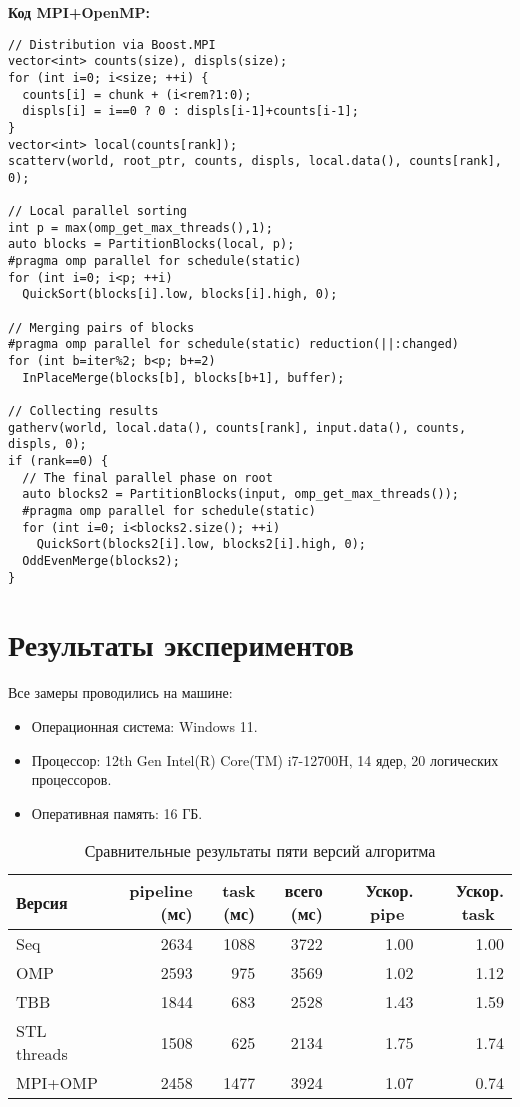 \documentclass[12pt]{article}
\begin{document}
\noindent\textbf{Код MPI+OpenMP:}
\lstset{language=C++}
\begin{lstlisting}
// Distribution via Boost.MPI
vector<int> counts(size), displs(size);
for (int i=0; i<size; ++i) {
  counts[i] = chunk + (i<rem?1:0);
  displs[i] = i==0 ? 0 : displs[i-1]+counts[i-1];
}
vector<int> local(counts[rank]);
scatterv(world, root_ptr, counts, displs, local.data(), counts[rank], 0);

// Local parallel sorting
int p = max(omp_get_max_threads(),1);
auto blocks = PartitionBlocks(local, p);
#pragma omp parallel for schedule(static)
for (int i=0; i<p; ++i)
  QuickSort(blocks[i].low, blocks[i].high, 0);

// Merging pairs of blocks
#pragma omp parallel for schedule(static) reduction(||:changed)
for (int b=iter%2; b<p; b+=2)
  InPlaceMerge(blocks[b], blocks[b+1], buffer);

// Collecting results
gatherv(world, local.data(), counts[rank], input.data(), counts, displs, 0);
if (rank==0) {
  // The final parallel phase on root
  auto blocks2 = PartitionBlocks(input, omp_get_max_threads());
  #pragma omp parallel for schedule(static)
  for (int i=0; i<blocks2.size(); ++i)
    QuickSort(blocks2[i].low, blocks2[i].high, 0);
  OddEvenMerge(blocks2);
}
\end{lstlisting}

\clearpage
\section{Результаты экспериментов}
\hspace*{1.25em}Все замеры проводились на машине:
\begin{itemize}
  \item Операционная система: Windows 11.
  \item Процессор: 12th Gen Intel(R) Core(TM) i7-12700H, 14 ядер, 20 логических процессоров.
  \item Оперативная память: 16 ГБ.
\end{itemize}

\begin{table}[htbp]
\centering
\caption{Сравнительные результаты пяти версий алгоритма}
\begin{tabular}{|l|r|r|r|r|r|}
\hline
\textbf{Версия} & \textbf{pipeline (мс)} & \textbf{task (мс)} & \textbf{всего (мс)} & \textbf{~Ускор. pipe~} & \textbf{~Ускор. task~} \\
\hline
Seq        & 2634 & 1088 & 3722 & 1.00  & 1.00  \\
OMP        & 2593 &  975 & 3569 & 1.02  & 1.12  \\
TBB        & 1844 &  683 & 2528 & 1.43  & 1.59  \\
STL threads& 1508 &  625 & 2134 & 1.75  & 1.74  \\
MPI+OMP    & 2458 & 1477 & 3924 & 1.07  & 0.74  \\
\hline
\end{tabular}
\label{tab:results}
\end{table}
\end{document}
